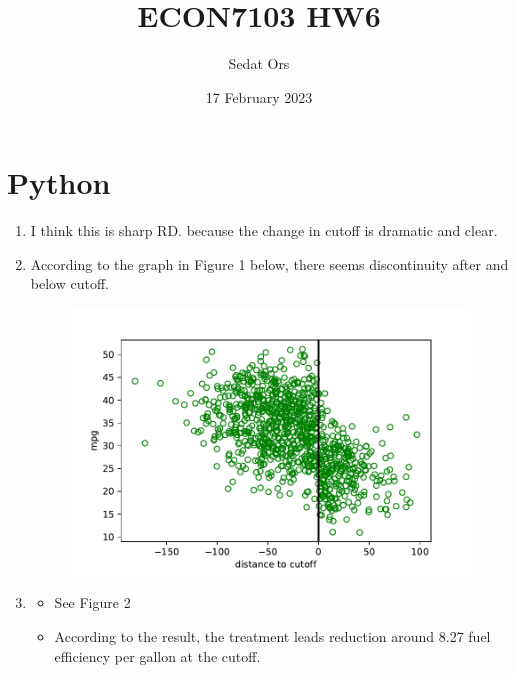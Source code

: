 \documentclass{article}
\title{ECON7103 HW6}
\author{Sedat Ors}
\date{17 February 2023}
\begin{document}
\maketitle
\section{Python}
\vspace{0.5cm}
\begin{enumerate}

\item I think this is sharp RD. because the change in cutoff is dramatic and clear.

\item According to the graph in Figure 1 below, there seems discontinuity after and below cutoff.
\begin{figure}[]
    \centering
     \includegraphics{HW6Q2.pdf}
    \caption{}
    \label{tab:question3}
\end{figure}

\item 
\begin{itemize}
    \item See Figure 2
    \item According to the result, the treatment leads reduction around 8.27 fuel efficiency per gallon at the cutoff. 
\end{itemize}


\end{enumerate}
\end{document}
